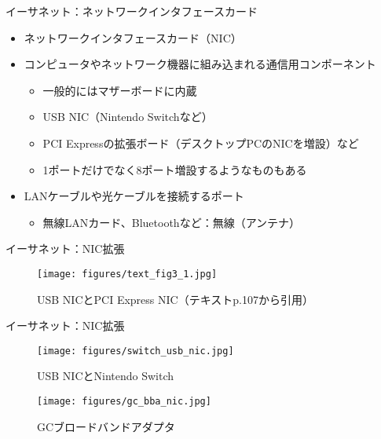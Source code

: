 \documentclass[12pt,aspectratio=169]{beamer}
\begin{document}
\begin{frame}{イーサネット：ネットワークインタフェースカード}

  \begin{itemize}
    \item ネットワークインタフェースカード（NIC）
    \item コンピュータやネットワーク機器に組み込まれる通信用コンポーネント
    \begin{itemize}
      \item 一般的にはマザーボードに内蔵
      \item USB NIC（Nintendo Switchなど）
      \item PCI Expressの拡張ボード（デスクトップPCのNICを増設）など
      \item 1ポートだけでなく8ポート増設するようなものもある
    \end{itemize}
    \item LANケーブルや光ケーブルを接続するポート
    \begin{itemize}
      \item 無線LANカード、Bluetoothなど：無線（アンテナ）
    \end{itemize}
  \end{itemize}

\end{frame}

\begin{frame}{イーサネット：NIC拡張}

  \begin{figure}
    \centering
    \texttt{[image: figures/text\_fig3\_1.jpg]}
    \label{fig:nic}
    \caption{USB NICとPCI Express NIC（テキストp.107から引用）}
  \end{figure}

\end{frame}

\begin{frame}{イーサネット：NIC拡張}

  \begin{minipage}{0.48\textwidth}
    \begin{figure}
      \centering
      \texttt{[image: figures/switch\_usb\_nic.jpg]}
      \label{fig:swnic}
      \caption{USB NICとNintendo Switch \cite{ninten:sw}}
    \end{figure}
  \end{minipage}
  \hfill
  \begin{minipage}{0.48\textwidth}
    \vspace{-1\baselineskip}
    \centering
    \begin{figure}
      \centering
      \texttt{[image: figures/gc\_bba\_nic.jpg]}
      \label{fig:gcnic}
      \caption{GCブロードバンドアダプタ \cite{ninten:gc}}
    \end{figure}
  \end{minipage}

\end{frame}
\end{document}
